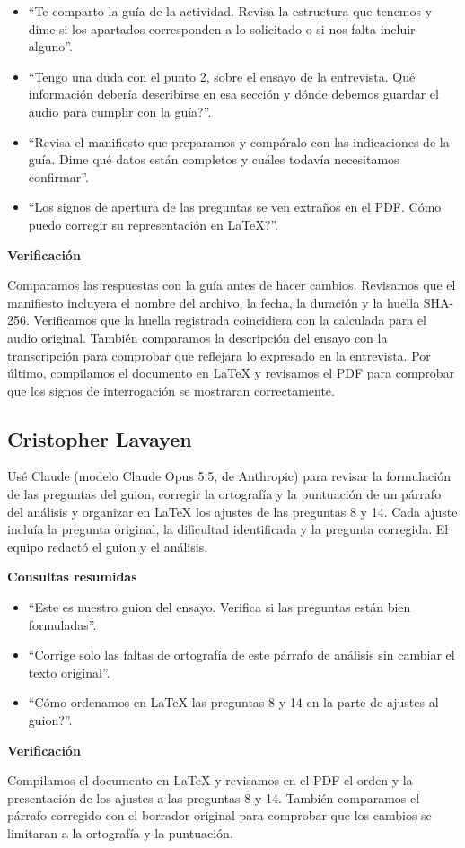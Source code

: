 \documentclass[11pt,a4paper]{article}
\begin{document}
\begin{itemize}
    \item ``Te comparto la guía de la actividad. Revisa la estructura
    que tenemos y dime si los apartados corresponden a lo solicitado
    o si nos falta incluir alguno''.

    \item ``Tengo una duda con el punto 2, sobre el ensayo de la
    entrevista. \textquestiondown{}Qué información debería describirse
    en esa sección y dónde debemos guardar el audio para cumplir con
    la guía?''.

    \item ``Revisa el manifiesto que preparamos y compáralo con las
    indicaciones de la guía. Dime qué datos están completos y cuáles
    todavía necesitamos confirmar''.

    \item ``Los signos de apertura de las preguntas se ven extraños
    en el PDF. \textquestiondown{}Cómo puedo corregir su representación
    en LaTeX?''.
\end{itemize}

\textbf{Verificación}

Comparamos las respuestas con la guía antes de hacer cambios. Revisamos
que el manifiesto incluyera el nombre del archivo, la fecha, la duración
y la huella SHA-256. Verificamos que la huella registrada coincidiera
con la calculada para el audio original. También comparamos la
descripción del ensayo con la transcripción para comprobar que
reflejara lo expresado en la entrevista. Por último, compilamos el
documento en LaTeX y revisamos el PDF para comprobar que los signos de
interrogación se mostraran correctamente.

\subsection*{Cristopher Lavayen}

Usé Claude (modelo Claude Opus 5.5, de Anthropic) para revisar la
formulación de las preguntas del guion, corregir la ortografía y la
puntuación de un párrafo del análisis y organizar en LaTeX los ajustes
de las preguntas 8 y 14. Cada ajuste incluía la pregunta original,
la dificultad identificada y la pregunta corregida. El equipo redactó
el guion y el análisis.

\textbf{Consultas resumidas}

\begin{itemize}
    \item ``Este es nuestro guion del ensayo. Verifica si las preguntas
    están bien formuladas''.

    \item ``Corrige solo las faltas de ortografía de este párrafo de
    análisis sin cambiar el texto original''.

    \item ``\textquestiondown{}Cómo ordenamos en LaTeX las preguntas
    8 y 14 en la parte de ajustes al guion?''.
\end{itemize}

\textbf{Verificación}

Compilamos el documento en LaTeX y revisamos en el PDF el orden y la
presentación de los ajustes a las preguntas 8 y 14. También comparamos
el párrafo corregido con el borrador original para comprobar que los
cambios se limitaran a la ortografía y la puntuación.
\end{document}
